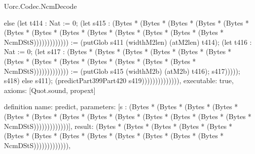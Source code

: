 \begin{lexlean}{Uorc.Codec.NcmDecode}
\begin{semanticmodule}
{else (let t414 : Nat := 0; (let s415 : (Bytes * (Bytes * (Bytes * (Bytes * (Bytes * (Bytes * (Bytes * (Bytes * (Bytes * (Bytes * (Bytes * (Bytes * (Bytes * NcmDStS))))))))))))) := (putGlob s411 (widthM2len) (atM2len) t414); (let t416 : Nat := 0; (let s417 : (Bytes * (Bytes * (Bytes * (Bytes * (Bytes * (Bytes * (Bytes * (Bytes * (Bytes * (Bytes * (Bytes * (Bytes * (Bytes * NcmDStS))))))))))))) := (putGlob s415 (widthM2b) (atM2b) t416); s417))))); s418) else s411); (predictPart399Part420 s419)))))))))))))),
  executable: true,
  axioms: [Quot.sound, propext]
}

definition{
  name: predict,
  parameters: [s : (Bytes * (Bytes * (Bytes * (Bytes * (Bytes * (Bytes * (Bytes * (Bytes * (Bytes * (Bytes * (Bytes * (Bytes * (Bytes * NcmDStS)))))))))))))],
  result: (Bytes * (Bytes * (Bytes * (Bytes * (Bytes * (Bytes * (Bytes * (Bytes * (Bytes * (Bytes * (Bytes * (Bytes * (Bytes * NcmDStS))))))))))))),
}
\end{semanticmodule}
\end{lexlean}
